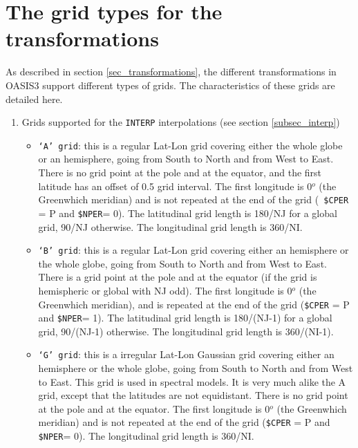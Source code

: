 \newpage
\appendix
\chapter{The grid types for the transformations}
\label{subsec_gridtypes}

As described in section \ref{sec_transformations}, the different
transformations in OASIS3 support different types of grids. The
characteristics of these grids are detailed here.

\begin{enumerate}

\item Grids supported for the {\tt INTERP}
    interpolations (see section \ref{subsec_interp})

\begin{itemize}
 
\item {\tt `A' grid}: this is a regular Lat-Lon grid covering either
      the whole globe or an hemisphere, going from South to North and
      from West to East.  There is no grid point at the
      pole and at the equator, and the first latitude has an offset of
      0.5 grid interval. The first longitude is 0$^o$ (the Greenwhich
      meridian) and is not repeated at the end of the grid ({\tt
      \$CPER} = P and {\tt \$NPER}= 0).  The latitudinal grid length
      is 180/NJ for a global grid, 90/NJ otherwise. The longitudinal
      grid length is 360/NI. 

\item {\tt `B' grid}: this is a regular Lat-Lon grid covering either
      an hemisphere or the whole globe, going from South to North and
      from West to East. There is a grid point at the
      pole and at the equator (if the grid is hemispheric or global
      with NJ odd). The first longitude is 0$^o$ (the Greenwhich
      meridian), and is repeated at the end of the grid ({\tt \$CPER}
      = P and {\tt \$NPER}= 1).  The latitudinal grid length is
      180/(NJ-1) for a global grid, 90/(NJ-1) otherwise. The
      longitudinal grid length is 360/(NI-1). 

  
\item {\tt `G' grid}: this is a irregular Lat-Lon Gaussian grid
covering either an hemisphere or the whole globe, going from South to
North and from West to East. This grid is used in spectral models. It
is very much alike the A grid, except that the latitudes are not
equidistant. There is no grid point at the pole and at the
equator. The first longitude is 0$^o$ (the Greenwhich meridian) and is
not repeated at the end of the grid ({\tt \$CPER} = P and {\tt
\$NPER}= 0).  The longitudinal grid length is 360/NI.  



\end{itemize}
\end{enumerate}
